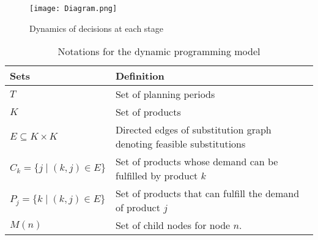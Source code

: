 \documentclass[10pt]{article}
\newcommand{\TI}{T}
\newcommand{\ka}{k} %
\newcommand{\KA}{K}
\newcommand{\jey}{j} %
\begin{document}
\begin{figure}[!h]
\begin{center}
\texttt{[image: Diagram.png]}
\caption{Dynamics of decisions at each stage} 
\label{MultistageDynamics}
\end{center}
\end{figure}





\begin{table}[H]
\centering
\caption{Notations for the dynamic programming model}
\begin{adjustbox}{width=1\textwidth,center=\textwidth}
\begin{tabular}{ll}
\toprule
{\textbf {Sets}} & {\textbf {Definition}} \\ \midrule
$\TI$  & Set of planning periods \\ 
$\KA$  & Set of products \\
$E \subseteq \KA \times \KA$  & Directed edges of substitution graph denoting feasible substitutions
\\
$ C_{k} = \{j \mid (k,j) \in E\}$  & Set of products whose demand can be fulfilled by product $\ka$  \\
$ P_{j} = \{k \mid (k,j) \in E\}$  & Set of products that can fulfill the demand of product $j$ \\
$ M(n) $  & Set of child nodes for node $n$. \\


\end{tabular}
\end{adjustbox}
\end{table}
\end{document}
